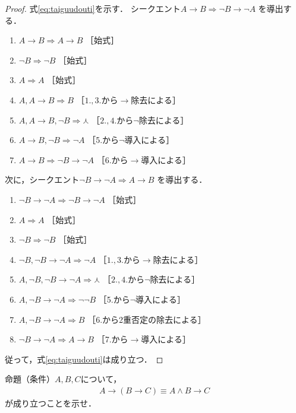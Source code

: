    \begin{proof}
     式\eqref{eq:taiguudouti}を示す．
     シークエント$A \to B \Longrightarrow \lnot B \to \lnot A$
     を導出する．
     \begin{enumerate}[1. ]
       \item $A \to B \Longrightarrow A \to B$ \quad ［始式］
       \item $\lnot B \Longrightarrow \lnot B$ \quad ［始式］
       \item $A \Longrightarrow A $ \quad ［始式］
       \item $A,  A \to B \Longrightarrow B$ \quad ［$1., 3.$から$\to$除去による］
       \item $A,  A \to B ,  \lnot B \Longrightarrow \curlywedge$
              \quad ［$2., 4.$から$\lnot$除去による］
       \item $A \to B ,  \lnot B \Longrightarrow \lnot A$ \quad ［5.から$\lnot$導入による］
       \item $A \to B \Longrightarrow \lnot B \to \lnot A$ \quad ［6.から$\to$導入による］
     \end{enumerate}
     次に，シークエント$\lnot B \to \lnot A \Longrightarrow A \to B$
     を導出する．
     \begin{enumerate}[1. ]
       \item $\lnot B \to \lnot A \Longrightarrow \lnot B \to \lnot A$
              \quad ［始式］
       \item $A \Longrightarrow A $ \quad ［始式］
       \item $\lnot B \Longrightarrow \lnot B$ \quad ［始式］
       \item $\lnot B ,  \lnot B \to \lnot A \Longrightarrow \lnot A$
              \quad ［$1., 3.$から$\to$除去による］
       \item $A,  \lnot B ,  \lnot B \to \lnot A \Longrightarrow \curlywedge$
              \quad ［$2., 4.$から$\lnot$除去による］
       \item $A ,  \lnot B \to \lnot A \Longrightarrow \lnot \lnot B $
              \quad ［5.から$\lnot$導入による］
       \item $A ,  \lnot B \to \lnot A \Longrightarrow B $
              \quad ［6.から2重否定の除去による］
       \item $\lnot B \to \lnot A \Longrightarrow A \to B$
              \quad ［7.から$\to$導入による］
     \end{enumerate}
     従って，式\eqref{eq:taiguudouti}は成り立つ．
   \end{proof}
   \begin{que} \label{que:tototo}
     命題（条件）$A,  B,  C$について，
     \begin{align}
       A \to ( B \to C) \equiv A \land B \to C
       \label{eq:tototo}
     \end{align}
     が成り立つことを示せ．
   \end{que}

